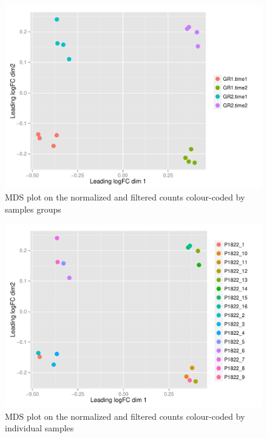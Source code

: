 \documentclass[12pt]{article}
\begin{document}


\begin{figure}[H]
\begin{center}
\includegraphics{9999_report-fig1}
\end{center}
\caption{MDS plot on the normalized and filtered counts colour-coded by samples groups}
\end{figure}  

\begin{figure}[H]
\begin{center}
\includegraphics{9999_report-fig2}
\end{center}
\caption{MDS plot on the normalized and filtered counts colour-coded by individual samples}
\end{figure} 
\end{document}
